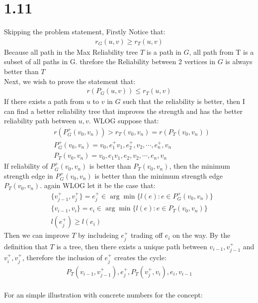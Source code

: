 \documentclass[]{article}
\theoremstyle{definition}
\begin{document}
\section{1.11}
    Skipping the problem statement, Firstly Notice that: 
    \begin{align}
        r_G(u, v) \ge r_T(u, v)
    \end{align}
    Because all path in the Max Reliability tree $T$ is a path in $G$, all path from T is a subset of all paths in G. threfore the Reliability between 2 vertices in $G$ is always better than $T$
    \\
    Next, we wish to prove the statement that: 
    \begin{align}
        r(P_G(u, v)) \le r_T(u, v)
    \end{align}
    If there exists a path from $u$ to $v$ in $G$ such that the reliability is better, then I can find a better reliability tree that improves the strength and has the better reliability path between $u, v$. WLOG suppose that: 
    \begin{align}
        & r(P_G^+(v_0, v_n)) > r_T(v_0, v_n) = r(P_T(v_0, v_n))
        \\
        & P_G^+(v_0, v_n) = v_0, e_1^+ v_1, e_2^+, v_2, \cdots , e_n^+, v_n
        \\
        & P_T(v_0, v_n) = v_0, e_1 v_1, e_2, v_2, \cdots , e_n, v_n
    \end{align}
    If reliability of $P^+_G(v_0, v_n)$ is better than $P_T(v_0, v_n)$, then the minimum strength edge in $P_G^+(v_0, v_n)$ is better than the minimum strength edge $P_T(v_0, v_n)$. again WLOG let it be the case that: 
    \begin{align}
        & \{v^+_{j - 1}, v^+_{j}\} =e_j^+ \in \arg\min\{l(e): e\in P_G^+(v_0, v_n)\}
        \\
        & \{v_{i - 1}, v_i\}=e_i \in \arg\min\{l(e): e\in P_T(v_0, v_n)\}
        \\
        & l(e_j^+)\ge l(e_i)
    \end{align}
    Then we can improve $T$ by includeing $e_j^+$ trading off $e_i$ on the way. By the definition that $T$ is a tree, then there exists a unique path between $v_{i - 1}, v_{j - 1}^+$ and $v_{i}^+, v_j^+$, therefore the inclusion of $e_j^+$ creates the cycle: 
    \begin{align}
        P_T(v_{i - 1}, v^+_{j - 1}), e_j^+, P_T(v_j^+, v_i), e_i, v_{i - 1}
    \end{align}
    \\
    For an simple illustration with concrete numbers for the concept: 
\end{document}
